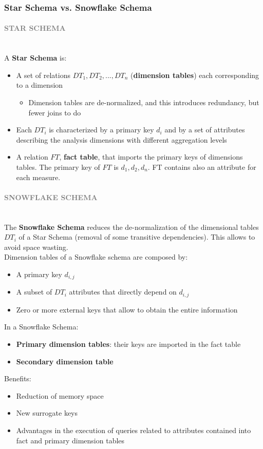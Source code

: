\documentclass[10pt,a4paper]{article}
\newcommand{\myparagraph}[1]{\paragraph{\normalsize{\textcolor{gray}{\uppercase{\textbf{#1}}}} }\mbox{} \vspace{0.5em}\\}
\begin{document}
\subsubsection{Star Schema vs. Snowflake Schema}
\myparagraph{STAR SCHEMA}
A \textbf{Star Schema} is:
\begin{itemize}
	\item A set of relations $DT_1, DT_2,..., DT_n$ (\textbf{dimension tables}) each corresponding to a dimension
	\begin{itemize}
		\item Dimension tables are de-normalized, and this introduces redundancy, but fewer joins to do
	\end{itemize}
	\item Each $DT_i$ is characterized by a primary key $d_i$ and by a set of attributes describing the analysis dimensions with different aggregation levels
	\item A relation $FT$, \textbf{fact table}, that imports the primary keys of dimensions tables. The primary key of $FT$ is $d_1,d_2,d_n$. FT contains also an attribute for each measure.
\end{itemize}
\myparagraph{SNOWFLAKE SCHEMA}
The \textbf{Snowflake Schema} reduces the de-normalization of the dimensional tables $DT_i$ of a Star Schema (removal of some transitive dependencies). This allows to avoid space wasting. \\
Dimension tables of a Snowflake schema are composed by:
\begin{itemize}
	\item A primary key $d_{i,j}$
	\item A subset of $DT_i$ attributes that directly depend on $d_{i,j}$
	\item Zero or more external keys that allow to obtain the entire information
\end{itemize}
In a Snowflake Schema:
\begin{itemize}
	\item \textbf{Primary dimension tables}: their keys are imported in the fact table
	\item \textbf{Secondary dimension table}
\end{itemize}
Benefits:
\begin{itemize}
	\item Reduction of memory space
	\item New surrogate keys
	\item Advantages in the execution of queries related to attributes contained into fact and primary dimension tables
\end{itemize}
\end{document}

